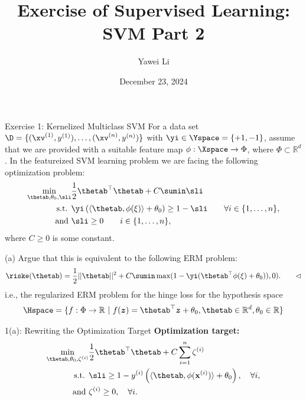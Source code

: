 \documentclass[aspectratio=169]{beamer}
\title[]{\textbf{Exercise of Supervised Learning: \\ SVM Part 2}}
\author{Yawei Li}
\institute[LMU]
{
\\
  \texttt{yawei.li@stat.uni-muenchen.de}
}
\date{December 23, 2024}
\newcommand{\zv}{\bm{z}}
\renewcommand{\phixi}{\phi(\xi)}
\begin{document}
\begin{frame}
\titlepage
\end{frame}

\begin{frame}{Exercise 1: Kernelized Multiclass SVM}
	\small
	For a data set $\D = \{(\xv^{(1)}, y^{(1)}), \ldots, (\xv^{(n)}, y^{(n)}) \}$ with $\yi \in \Yspace = \{+1, -1 \}$, assume that we are provided with a suitable feature map $\phi: \Xspace \to \Phi$, where $\Phi \subset \mathbb{R}^d$. In the featureized SVM learning problem we are facing the following optimization problem:
	\begin{align*}
		\min_{\thetab, \theta_0, \sli} &\frac{1}{2} \thetab^\top \thetab + C \sumin \sli \\
		\text{s.t. } & \yi \left(\left\langle \thetab, \phixi \right\rangle  + \theta_0\right) \geq 1 - \sli \qquad \forall i \in \{1, \ldots, n \}, \\
		\text{and } & \sli \geq 0 \qquad i \in \{1, \ldots, n \},
	\end{align*}
	where $C \geq 0$ is some constant.
	
	(a) Argue that this is equivalent to the following ERM problem:
		\begin{align*}
			\riske(\thetab) = \frac{1}{2} ||\thetab||^2 + C\sumin \max(1 - \yi(\thetab^\top \phixi + \theta_0)), 0). \qquad \lhd 
		\end{align*}
		i.e., the regularized ERM problem for the hinge loss for the hypothesis space 
		\begin{align*}
			\Hspace = \{f: \Phi \to \mathbb{R} \ | \ f(\zv) = \thetab^\top \zv + \theta_0, \thetab \in \mathbb{R}^d, \theta_0 \in \mathbb{R} \}
		\end{align*}
\end{frame}

\begin{frame}{1(a): Rewriting the Optimization Target}
	\textbf{Optimization target:}
	\begin{align*}
	    \min_{\thetab, \theta_0, \zeta^{(i)}} &\frac{1}{2} \thetab^\top \thetab + C \sum_{i=1}^n \zeta^{(i)} \\
	    \text{s.t. } & \sli \geq 1 - y^{(i)} \left(\langle \thetab, \phi(\mathbf{x}^{(i)}) \rangle + \theta_0 \right), \quad \forall i, \\
	    \text{and } & \zeta^{(i)} \geq 0, \quad \forall i.
	\end{align*}
	
\end{frame}
\end{document}
